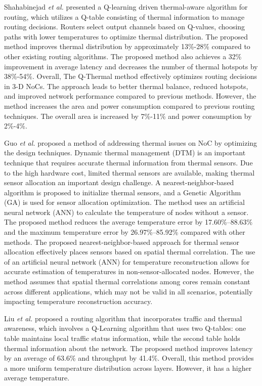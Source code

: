 \documentclass[conference]{IEEEtran}
\begin{document}
Shahabinejad \textit{et al.} \cite{2} presented a Q-learning driven thermal-aware algorithm for routing, which utilizes a Q-table consisting of thermal information to manage routing decisions. Routers select output channels based on Q-values, choosing paths with lower temperatures to optimize thermal distribution. The proposed method improves thermal distribution by approximately 13\%-28\% compared to other existing routing algorithms. The proposed method also achieves a 32\% improvement in average latency and decreases the number of thermal hotspots by 38\%-54\%. Overall, The Q-Thermal method effectively optimizes routing decisions in 3-D NoCs. The approach leads to better thermal balance, reduced hotspots, and improved network performance compared to previous methods. However, the method increases the area and power consumption compared to previous routing techniques. The overall area is increased by 7\%-11\% and power consumption by 2\%-4\%.

Guo \textit{et al.} \cite{3} proposed a method of addressing thermal issues on NoC by optimizing the design techniques. Dynamic thermal management (DTM) is an important technique that requires accurate thermal information from thermal sensors. Due to the high hardware cost, limited thermal sensors are available, making thermal sensor allocation an important design challenge. A nearest-neighbor-based algorithm is proposed to initialize thermal sensors, and a Genetic Algorithm (GA) is used for sensor allocation optimization. The method uses an artificial neural network (ANN) to calculate the temperature of nodes without a sensor. The proposed method reduces the average temperature error by 17.60\%–88.63\% and the maximum temperature error by 26.97\%–85.92\% compared with other methods. The proposed nearest-neighbor-based approach for thermal sensor allocation effectively places sensors based on spatial thermal correlation. The use of an artificial neural network (ANN) for temperature reconstruction allows for accurate estimation of temperatures in non-sensor-allocated nodes. However, the method assumes that spatial thermal correlations among cores remain constant across different applications, which may not be valid in all scenarios, potentially impacting temperature reconstruction accuracy.

Liu \textit{et al.}\cite{4} proposed a routing algorithm that incorporates traffic and thermal awareness, which involves a Q-Learning algorithm that uses two Q-tables: one table maintains local traffic status information, while the second table holds thermal information about the network. The proposed method improves latency by an average of 63.6\% and throughput by 41.4\%. Overall, this method provides a more uniform temperature distribution across layers. However, it has a higher average temperature.
\end{document}
